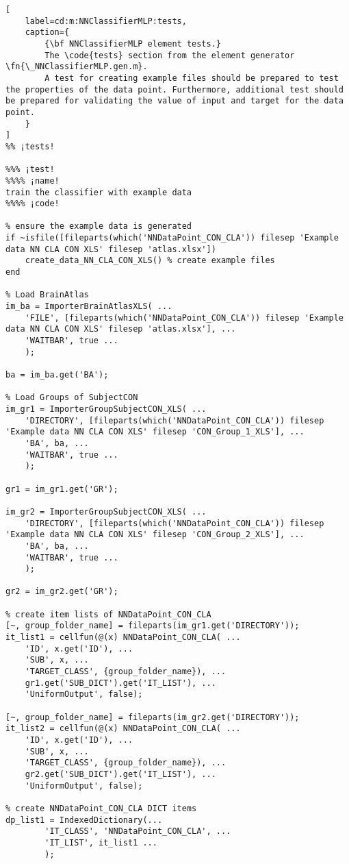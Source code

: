 \documentclass{tufte-handout}
\begin{document}
\begin{lstlisting}[
	label=cd:m:NNClassifierMLP:tests,
	caption={
		{\bf NNClassifierMLP element tests.}
		The \code{tests} section from the element generator \fn{\_NNClassifierMLP.gen.m}.
		A test for creating example files should be prepared to test the properties of the data point. Furthermore, additional test should be prepared for validating the value of input and target for the data point.
	}
]			
%% ¡tests!

%%% ¡test!
%%%% ¡name!
train the classifier with example data
%%%% ¡code!

% ensure the example data is generated
if ~isfile([fileparts(which('NNDataPoint_CON_CLA')) filesep 'Example data NN CLA CON XLS' filesep 'atlas.xlsx'])
    create_data_NN_CLA_CON_XLS() % create example files
end

% Load BrainAtlas
im_ba = ImporterBrainAtlasXLS( ...
    'FILE', [fileparts(which('NNDataPoint_CON_CLA')) filesep 'Example data NN CLA CON XLS' filesep 'atlas.xlsx'], ...
    'WAITBAR', true ...
    );

ba = im_ba.get('BA');

% Load Groups of SubjectCON
im_gr1 = ImporterGroupSubjectCON_XLS( ...
    'DIRECTORY', [fileparts(which('NNDataPoint_CON_CLA')) filesep 'Example data NN CLA CON XLS' filesep 'CON_Group_1_XLS'], ...
    'BA', ba, ...
    'WAITBAR', true ...
    );

gr1 = im_gr1.get('GR');

im_gr2 = ImporterGroupSubjectCON_XLS( ...
    'DIRECTORY', [fileparts(which('NNDataPoint_CON_CLA')) filesep 'Example data NN CLA CON XLS' filesep 'CON_Group_2_XLS'], ...
    'BA', ba, ...
    'WAITBAR', true ...
    );

gr2 = im_gr2.get('GR');

% create item lists of NNDataPoint_CON_CLA
[~, group_folder_name] = fileparts(im_gr1.get('DIRECTORY'));
it_list1 = cellfun(@(x) NNDataPoint_CON_CLA( ...
    'ID', x.get('ID'), ...
    'SUB', x, ...
    'TARGET_CLASS', {group_folder_name}), ...
    gr1.get('SUB_DICT').get('IT_LIST'), ...
    'UniformOutput', false);

[~, group_folder_name] = fileparts(im_gr2.get('DIRECTORY'));
it_list2 = cellfun(@(x) NNDataPoint_CON_CLA( ...
    'ID', x.get('ID'), ...
    'SUB', x, ...
    'TARGET_CLASS', {group_folder_name}), ...
    gr2.get('SUB_DICT').get('IT_LIST'), ...
    'UniformOutput', false);

% create NNDataPoint_CON_CLA DICT items
dp_list1 = IndexedDictionary(...
        'IT_CLASS', 'NNDataPoint_CON_CLA', ...
        'IT_LIST', it_list1 ...
        );


\end{lstlisting}
\end{document}
